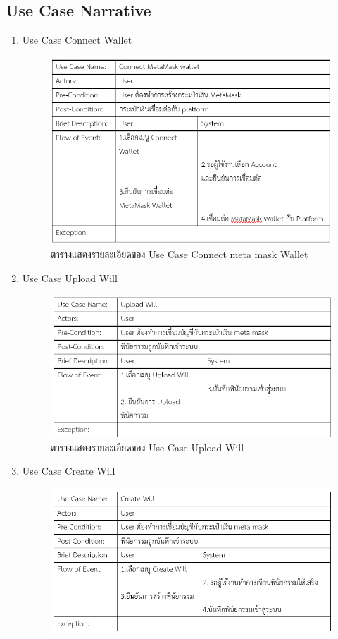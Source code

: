 \documentclass[12pt,oneside,openright,a4paper]{cpe-thai-project}
\begin{document}
\subsection{Use Case Narrative}
\begin{enumerate}[label=\thesubsection.\arabic*,leftmargin=0pt,itemindent=2.5cm]
\item Use Case Connect Wallet
	\begin{figure}[!htb]
		\centering
		\includegraphics[scale=0.8]{connectwallet}
		\caption{ตารางแสดงรายละเอียดของ Use Case Connect meta mask Wallet}
	\end{figure}
	\FloatBarrier
\item Use Case Upload Will
	\begin{figure}[!htb]
		\centering
		\includegraphics[scale=0.8]{uploadWill}
		\caption{ตารางแสดงรายละเอียดของ Use Case Upload Will}
	\end{figure}
	\FloatBarrier
\item Use Case Create Will
	\begin{figure}[!htb]
		\centering
		\includegraphics[scale=0.8]{usecasecreatewill}

\end{figure}
\end{enumerate}
\end{document}
